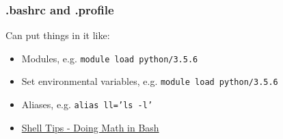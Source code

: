 \documentclass{beamer}
\newcommand{\code}[1]{\colorbox{codegray}{\texttt{#1}}}
\begin{document}
\begin{frame}
\frametitle{.bashrc and .profile}
Can put things in it like:
\bigskip
\begin{itemize}
    \item Modules, e.g. \code{module load python/3.5.6}
    \bigskip
    \pause
    \item Set environmental variables, e.g. \code{module load python/3.5.6}
    \pause
    \bigskip
    \item Aliases, e.g. \code{alias ll='ls -l'}
    \pause
    \bigskip
    \item \href{https://www.shell-tips.com/bash/math-arithmetic-calculation/}{Shell Tips - Doing Math in Bash}
\end{itemize}
\end{frame}
\end{document}
